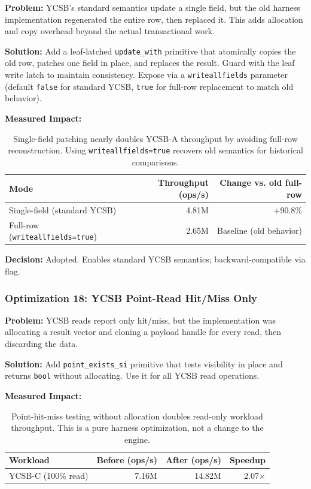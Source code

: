 \documentclass[11pt]{article}
\newcommand{\code}[1]{\texttt{#1}}
\begin{document}
\textbf{Problem:}
YCSB's standard semantics update a single field, but the old harness implementation
regenerated the entire row, then replaced it. This adds allocation and copy overhead
beyond the actual transactional work.

\textbf{Solution:}
Add a leaf-latched \code{update\_with} primitive that atomically copies the old row,
patches one field in place, and replaces the result. Guard with the leaf write latch
to maintain consistency. Expose via a \code{writeallfields} parameter (default \code{false}
for standard YCSB, \code{true} for full-row replacement to match old behavior).

\textbf{Measured Impact:}

\begin{table}[h]
\centering
\small
\begin{tabular}{lrr}
\toprule
\textbf{Mode} & \textbf{Throughput (ops/s)} & \textbf{Change vs. old full-row} \\
\midrule
Single-field (standard YCSB) & 4.81M & +90.8\% \\
Full-row (\code{writeallfields=true}) & 2.65M & Baseline (old behavior) \\
\bottomrule
\end{tabular}
\caption{Single-field patching nearly doubles YCSB-A throughput by avoiding full-row
reconstruction. Using \code{writeallfields=true} recovers old semantics for historical
comparisons.}
\label{tab:ycsb_patch}
\end{table}

\textbf{Decision:} Adopted. Enables standard YCSB semantics; backward-compatible via flag.

\subsubsection{Optimization 18: YCSB Point-Read Hit/Miss Only}

\textbf{Problem:}
YCSB reads report only hit/miss, but the implementation was allocating a result vector
and cloning a payload handle for every read, then discarding the data.

\textbf{Solution:}
Add \code{point\_exists\_si} primitive that tests visibility in place and returns
\code{bool} without allocating. Use it for all YCSB read operations.

\textbf{Measured Impact:}

\begin{table}[h]
\centering
\small
\begin{tabular}{lrrr}
\toprule
\textbf{Workload} & \textbf{Before (ops/s)} & \textbf{After (ops/s)} & \textbf{Speedup} \\
\midrule
YCSB-C (100\% read) & 7.16M & 14.82M & 2.07$\times$ \\
\bottomrule
\end{tabular}
\caption{Point-hit-miss testing without allocation doubles read-only workload throughput.
This is a pure harness optimization, not a change to the engine.}
\label{tab:ycsb_hit_miss}
\end{table}
\end{document}
